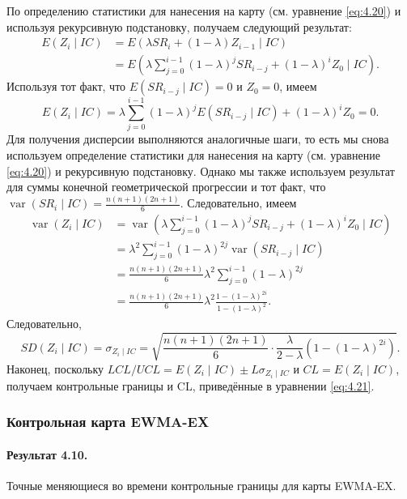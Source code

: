 По определению статистики для нанесения на карту (см. уравнение \eqref{eq:4.20}) и используя рекурсивную подстановку, получаем следующий результат:
\begin{align*}
	E(Z_i \mid IC) &= E\left( \lambda SR_i + (1 - \lambda)Z_{i-1} \mid IC \right) \\
	               &= E\left( \lambda\sum_{j=0}^{i-1}(1 - \lambda)^j SR_{i-j} + (1 - \lambda)^i Z_0 \mid IC \right).
\end{align*}
Используя тот факт, что \(E(SR_{i-j} \mid IC) = 0\) и \(Z_0 = 0\), имеем
\[
	E(Z_i \mid IC) = \lambda\sum_{j=0}^{i-1}(1 - \lambda)^j E(SR_{i-j} \mid IC) + (1 - \lambda)^i Z_0 = 0.
\]
Для получения дисперсии выполняются аналогичные шаги, то есть мы снова используем определение статистики для нанесения на карту (см. уравнение \eqref{eq:4.20}) и рекурсивную подстановку. Однако мы также используем результат для суммы конечной геометрической прогрессии и тот факт, что \(\operatorname{var}(SR_i \mid IC) = \frac{n(n + 1)(2n + 1)}{6}\). Следовательно, имеем
\begin{align*}
	\operatorname{var}(Z_i \mid IC) &= \operatorname{var}\left( \lambda\sum_{j=0}^{i-1}(1 - \lambda)^j SR_{i-j} + (1 - \lambda)^i Z_0 \mid IC \right) \\
	&= \lambda^2\sum_{j=0}^{i-1}(1 - \lambda)^{2j}\operatorname{var}(SR_{i-j} \mid IC) \\
	&= \frac{n(n + 1)(2n + 1)}{6}\lambda^2\sum_{j=0}^{i-1}(1 - \lambda)^{2j} \\
	&= \frac{n(n + 1)(2n + 1)}{6}\lambda^2\frac{1 - (1 - \lambda)^{2i}}{1 - (1 - \lambda)^2}.
\end{align*}
Следовательно,
\[
	SD(Z_i \mid IC) = \sigma_{Z_i \mid IC} = \sqrt{\frac{n(n + 1)(2n + 1)}{6}\cdot\frac{\lambda}{2 - \lambda}\left( 1 - (1 - \lambda)^{2i} \right)}.
\]
Наконец, поскольку \(LCL/UCL = E(Z_i \mid IC) \pm L\sigma_{Z_i \mid IC}\) и \(CL = E(Z_i \mid IC)\), получаем контрольные границы и CL, приведённые в уравнении \eqref{eq:4.21}.

\subsubsection{Контрольная карта EWMA-EX}

\paragraph{Результат 4.10.} Точные меняющиеся во времени контрольные границы для карты EWMA-EX.

